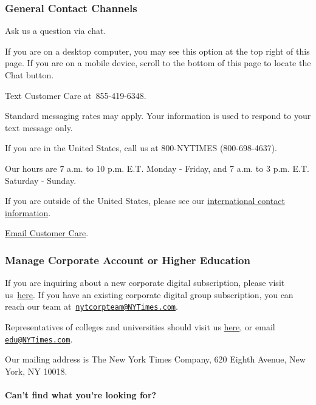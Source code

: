 \hypertarget{general-contact-channels}{%
\subsubsection{General Contact
Channels}\label{general-contact-channels}}

Ask us a question via chat.

If you are on a desktop computer, you may see this option at the top
right of this page. If you are on a mobile device, scroll to the bottom
of this page to locate the Chat button.

Text Customer Care at~855-419-6348.

Standard messaging rates may apply. Your information is used to respond
to your text message only.

If you are in the United States, call us at 800-NYTIMES (800-698-4637).

Our hours are 7 a.m. to 10 p.m. E.T. Monday - Friday, and 7 a.m. to 3
p.m. E.T. Saturday - Sunday.

If you are outside of the United States, please see our
\href{/hc/en-us/articles/115014792927-International-contact-info}{international
contact information}.

\href{/hc/en-us/requests/new}{Email Customer Care}.

\hypertarget{manage-corporate-account-or-higher-education}{%
\subsubsection{Manage Corporate Account or Higher
Education}\label{manage-corporate-account-or-higher-education}}

If you are inquiring about a new corporate digital subscription, please
visit us~\href{http://nytimesgroupsubscriptions.com/}{here}. If you have
an existing corporate digital group subscription, you can reach our team
at~\href{mailto:nytcorpteam@NYTimes.com}{\nolinkurl{nytcorpteam@NYTimes.com}}.

Representatives of colleges and universities should visit us
\href{https://nytimesgroupsubscriptions.com/?=customer-care}{here}, or
email \href{mailto:edu@NYTimes.com}{\nolinkurl{edu@NYTimes.com}}.

Our mailing address is The New York Times Company, 620 Eighth Avenue,
New York, NY 10018.

\hypertarget{cant-find-what-youre-looking-for}{%
\paragraph{Can't find what you're looking
for?}\label{cant-find-what-youre-looking-for}}

